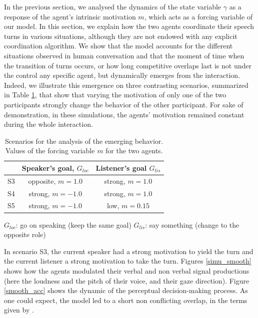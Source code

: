 In the previous section, we analysed the dynamics of the state variable $\gamma$ as a response of the agent's intrinsic motivation $m$, which acts as a forcing variable of our model. In this section, we explain how the two agents coordinate their speech turns in various situations, although they are not endowed with any explicit coordination algorithm. We show that the model accounts for the different situations observed in human conversation and that the moment of time when the transition of turns occurs, or how long competitive overlaps last is not under the control any specific agent, but dynamically emerges from the interaction. Indeed, we illustrate this emergence on three contrasting scenarios, summarized in Table \ref{tab_scenarios_emergence}, that show that varying the motivation of only one of the two participants strongly change the behavior of the other participant. For sake of demonstration, in these simulations, the agents' motivation remained constant during the whole interaction. 

\begin{table}
  \begin{center}
    \begin{tabular}{ccc}
      \hline
      \mbox{} & Speaker's goal, $G_{loc}$ & Listener's goal $G_{lis}$\\
      \hline
      S3 & opposite, $m=1.0$ & strong, $m=1.0$\\
      \hline
      S4 & strong, $m=-1.0$ & strong, $m=1.0$\\
      \hline
      S5 & strong, $m=-1.0$ & low, $m=0.15$\\
      \hline
    \end{tabular}
  \end{center}
  $G_{loc}$: go on speaking (keep the same goal)\linebreak
  $G_{lis}$: say something (change to the opposite role)

  \caption{Scenarios for the analysis of the emerging behavior. Values of the forcing variable $m$ for the two agents.}
  \label{tab_scenarios_emergence}
\end{table}

In scenario S3, the current speaker had a strong motivation to yield the turn and the current listener a strong motivation to take the turn. Figures \ref{simu_smooth} shows how the agents modulated their verbal and non verbal signal productions (here the loudness and the pitch of their voice, and their gaze direction). Figure \ref{smooth_acc} shows the dynamic of the perceptual decision-making process. As one could expect, the model led to a short non conflicting overlap, in the terms given by \citep{schegloff_overlapping_2000}. 


